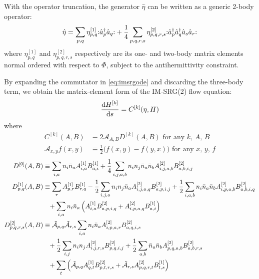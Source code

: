 With the operator truncation, the generator $\hat{\eta}$ can be written as a generic 2-body operator:
\begin{align*}
\hat{\eta} = \sum_{p, q} \eta_{p, q}^{[1]} \mathopen: \hat a_p^\dagger \hat a_q \mathclose: +
\frac{1}{4} \sum_{p, q, r, s}\eta_{p, q, r, s}^{[2]} \mathopen: \hat a_p^\dagger \hat a_q^\dagger \hat a_s \hat a_r \mathclose:
\end{align*}
where $\eta_{p, q}^{[1]}$ and $ \eta_{p, q, r, s}^{[2]}$ respectively are its one- and two-body matrix elements normal ordered with respect to $\Phi$, subject to the antihermittivity constraint.

By expanding the commutator in \eqref{eq:imsrgode} and discarding the three-body term, we obtain the matrix-element form of the IM-SRG(2) flow equation:
\begin{align}
    \frac{\operatorname{d\!} H^{[k]}}{\operatorname{d\!} s} = C^{[k]}(\eta, H) \label{eq:flowmxe}
\end{align}
where
\begin{align}
  C^{[k]}(A, B) &\equiv 2 \mathcal{A}_{A, B} D^{[k]}(A, B) \text{ for any $k$, $A$, $B$} \label{eq:commutmxe} \\
  \mathcal{A}_{x, y} f(x, y) &\equiv \frac{1}{2} \bigl(f(x, y) - f(y, x)\bigr) \text{ for any $x$, $y$, $f$}
\end{align}
\begin{align}
  D^{[0]}(A, B)
  &\equiv
    \sum_{i, a} n_i \bar{n}_a A^{[1]}_{i, a} B^{[1]}_{a, i}
    + \frac{1}{4} \sum_{i, j, a, b} n_i n_j \bar{n}_a \bar{n}_b A^{[2]}_{i, j, a, b} B^{[2]}_{a, b, i, j}
    \label{eq:flow0} \\
  D^{[1]}_{p, q}(A, B)
  &\equiv
    \sum_{r} A^{[1]}_{p, r} B^{[1]}_{r, q}
    - \frac{1}{2} \sum_{i, j, a} n_i n_j \bar{n}_a A^{[2]}_{i, j, a, q} B^{[2]}_{a, p, i, j}
    + \frac{1}{2} \sum_{i, a, b} n_i \bar{n}_a \bar{n}_b A^{[2]}_{i, p, a, b} B^{[2]}_{a, b, i, q}
    \notag \\
  &\hphantom{=}
    + \sum_{i, a} n_i \bar{n}_a \left(
    A^{[1]}_{i, a} B^{[2]}_{a, p, i, q}
    + A^{[2]}_{i, p, a, q} B^{[1]}_{a, i}
    \right)
    \label{eq:flow1} \\
  D^{[2]}_{p, q, r, s}(A, B)
  &\equiv
    \tilde{\mathcal{A}}_{p, q} \tilde{\mathcal{A}}_{r, s}
    \sum_{i, a} n_i \bar{n}_a A^{[2]}_{i, p, a, r} B^{[2]}_{a, q, i, s}
    \notag \\
  &\hphantom{=}
    + \frac{1}{2} \sum_{i, j} n_i n_j A^{[2]}_{i, j, r, s} B^{[2]}_{p, q, i, j}
    + \frac{1}{2} \sum_{a, b} \bar{n}_a \bar{n}_b A^{[2]}_{p, q, a, b} B^{[2]}_{a, b, r, s}
    \notag \\
  &\hphantom{=}
    + \sum_{t} \left(
    \tilde{\mathcal{A}}_{p, q} A^{[1]}_{q, t} B^{[2]}_{p, t, r, s}
    + \tilde{\mathcal{A}}_{r, s} A^{[2]}_{p, q, r, t} B^{[1]}_{t, s}
    \right)
    \label{eq:flow2}
\end{align}

